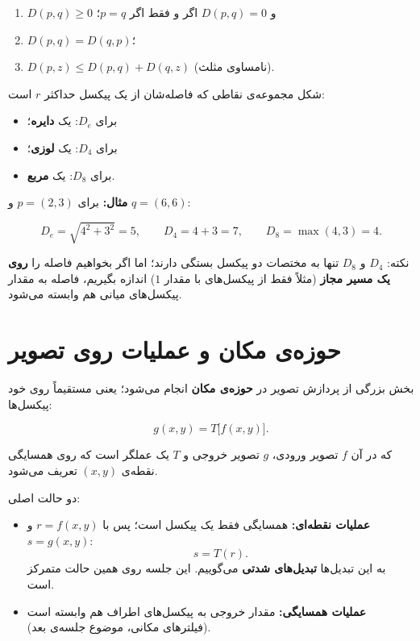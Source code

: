 \documentclass[11pt,a4paper]{article}
\begin{document}
	\begin{enumerate}
		\item $D(p,q)\geq0$ و $D(p,q)=0$ اگر و فقط اگر $p=q$؛
		\item $D(p,q)=D(q,p)$؛
		\item $D(p,z)\leq D(p,q)+D(q,z)$ (نامساوی مثلث).
	\end{enumerate}
	
	شکل مجموعه‌ی نقاطی که فاصله‌شان از یک پیکسل حداکثر $r$ است:
	
	\begin{itemize}
		\item برای $D_e$: یک \textbf{دایره}؛
		\item برای $D_4$: یک \textbf{لوزی}؛
		\item برای $D_8$: یک \textbf{مربع}.
	\end{itemize}
	
	\textbf{مثال:} برای $p=(2,3)$ و $q=(6,6)$:
	
	\[
	D_e=\sqrt{4^2+3^2}=5,
	\qquad
	D_4=4+3=7,
	\qquad
	D_8=\max(4,3)=4.
	\]
	
	نکته: $D_4$ و $D_8$ تنها به مختصات دو پیکسل بستگی دارند؛ اما اگر بخواهیم فاصله را
	\textbf{روی یک مسیر مجاز} (مثلاً فقط از پیکسل‌های با مقدار $1$) اندازه بگیریم،
	فاصله به مقدار پیکسل‌های میانی هم وابسته می‌شود.
	
	
	\section{حوزه‌ی مکان و عملیات روی تصویر}
	
	بخش بزرگی از پردازش تصویر در \textbf{حوزه‌ی مکان} انجام می‌شود؛ یعنی مستقیماً روی خود پیکسل‌ها:
	
	\[
	g(x,y)=T\big[f(x,y)\big].
	\]
	
	که در آن $f$ تصویر ورودی، $g$ تصویر خروجی و $T$ یک عملگر است که روی همسایگی
	نقطه‌ی $(x,y)$ تعریف می‌شود.
	
	دو حالت اصلی:
	
	\begin{itemize}
		\item \textbf{عملیات نقطه‌ای:} همسایگی فقط یک پیکسل است؛ پس با $r=f(x,y)$ و $s=g(x,y)$:
		\[
		s=T(r).
		\]
		به این تبدیل‌ها \textbf{تبدیل‌های شدتی} می‌گوییم. این جلسه روی همین حالت متمرکز است.
		\item \textbf{عملیات همسایگی:} مقدار خروجی به پیکسل‌های اطراف هم وابسته است
		(فیلترهای مکانی، موضوع جلسه‌ی بعد).
	\end{itemize}
	
\end{document}
